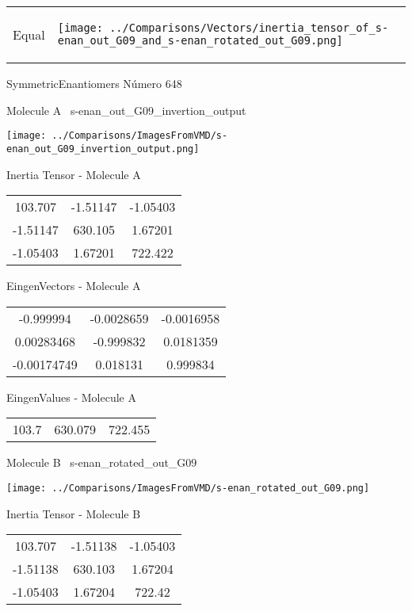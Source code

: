 \vtab[-5mm]
\begin{tabular}{*{2}{m{}}}
\begin{center}
\textcolor{NavyBlue}{\Large Equal}
\end{center}
&
\begin{center}
\texttt{[image: ../Comparisons/Vectors/inertia\_tensor\_of\_s-enan\_out\_G09\_and\_s-enan\_rotated\_out\_G09.png]}
\end{center}
\end{tabular}

 \newpage

\vtab[-3cm]
\begin{center}
{\large SymmetricEnantiomers \tab Número 648}
\end{center}
\begin{multicols}{2}
\begin{center}

Molecule A \
s-enan\_out\_G09\_invertion\_output

\texttt{[image: ../Comparisons/ImagesFromVMD/s-enan\_out\_G09\_invertion\_output.png]}

Inertia Tensor - Molecule A \\
\begin{tabular}{|c c c|}
103.707	 & 	-1.51147	 & 	-1.05403	 \\
-1.51147	 & 	630.105	 & 	1.67201	 \\
-1.05403	 & 	1.67201	 & 	722.422
\end{tabular}

\vtab
 EingenVectors - Molecule A     \\
\begin{tabular}{|c c c|}
-0.999994	 & 	-0.0028659	 & 	-0.0016958	 \\
0.00283468	 & 	-0.999832	 & 	0.0181359	 \\
-0.00174749	 & 	0.018131	 & 	0.999834
\end{tabular}

\vtab
 EingenValues - Molecule A     \\
\begin{tabular}{|c c c|}
103.7	 & 	630.079	 & 	722.455	 \\
\end{tabular}
\columnbreak

Molecule B \
s-enan\_rotated\_out\_G09

\texttt{[image: ../Comparisons/ImagesFromVMD/s-enan\_rotated\_out\_G09.png]}

Inertia Tensor - Molecule B \\
\begin{tabular}{|c c c|}
103.707	 & 	-1.51138	 & 	-1.05403	 \\
-1.51138	 & 	630.103	 & 	1.67204	 \\
-1.05403	 & 	1.67204	 & 	722.42
\end{tabular}


\end{center}
\end{multicols}
